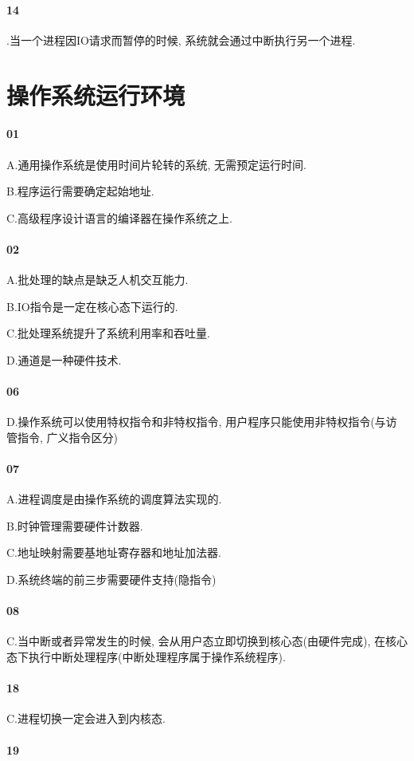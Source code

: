 \paragraph{14} \uppercase\expandafter{}.当一个进程因IO请求而暂停的时候, 系统就会通过中断执行另一个进程.
\section{操作系统运行环境}
\paragraph{01} A.通用操作系统是使用时间片轮转的系统, 无需预定运行时间.\par B.程序运行需要确定起始地址.\par C.高级程序设计语言的编译器在操作系统之上.
\paragraph{02} A.批处理的缺点是缺乏人机交互能力.\par B.IO指令是一定在核心态下运行的.\par C.批处理系统提升了系统利用率和吞吐量.\par D.通道是一种硬件技术.
\paragraph{06} D.操作系统可以使用特权指令和非特权指令, 用户程序只能使用非特权指令(与访管指令, 广义指令区分)
\paragraph{07} A.进程调度是由操作系统的调度算法实现的.\par B.时钟管理需要硬件计数器.\par C.地址映射需要基地址寄存器和地址加法器.\par D.系统终端的前三步需要硬件支持(隐指令)
\paragraph{08} C.当中断或者异常发生的时候, 会从用户态立即切换到核心态(由硬件完成), 在核心态下执行中断处理程序(中断处理程序属于操作系统程序).
\paragraph{18} C.进程切换一定会进入到内核态.
\paragraph{19} 
